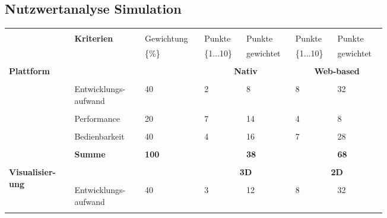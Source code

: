\documentclass[main.tex]{subfiles} %
\begin{document}

\subsection{Nutzwertanalyse Simulation}

\begin{table}[ht]
    \centering
    \begin{tabular}{|p{0.14\linewidth}|p{0.15\linewidth}|p{0.115\linewidth}|p{0.08\linewidth}|p{0.09\linewidth}|p{0.08\linewidth}|p{0.09\linewidth}|}
    \hline
        &&&&&&\\[-9pt]
        & \multirow{2}{*}{\textbf{Kriterien}} & Gewichtung & Punkte & Punkte & Punkte & Punkte \\[1pt]
        &  & \{\%\} & \{1...10\} & gewichtet & \{1...10\} & gewichtet \\[1pt]
        \hline
        \hline
        & \multicolumn{2}{c|}{} & \multicolumn{2}{c|}{} & \multicolumn{2}{c|}{} \\[-9pt]
        \multirow{5}{4em}{\textbf{Plattform}} & \multicolumn{2}{c|}{} & \multicolumn{2}{c|}{\textbf{Nativ}} & \multicolumn{2}{c|}{\textbf{Web-based}} \\[1pt]
        \cline{2-7}
        &&&&&&\\[-9pt]
        & Entwicklungs-aufwand & 40 & 2 & 8 & 8 & 32 \\[1pt]
        \cline{2-7}
        &&&&&&\\[-9pt]
        & Performance & 20 & 7 & 14 & 4 & 8 \\[1pt]
        \cline{2-7}
        &&&&&&\\[-9pt]
        & Bedienbarkeit & 40 & 4 & 16 & 7 & 28 \\[1pt]
        \cline{2-7}
        &&&&&&\\[-9pt]
        & \textbf{Summe} & \textbf{100} &  & \textbf{38} &  & \textbf{68} \\[1pt]
        \hline
        \hline
        & \multicolumn{2}{c|}{} & \multicolumn{2}{c|}{} & \multicolumn{2}{c|}{} \\[-9pt]
        \multirow{6}{4em}{\textbf{Visualisier-ung}} & \multicolumn{2}{c|}{} & \multicolumn{2}{c|}{\textbf{3D}} & \multicolumn{2}{c|}{\textbf{2D}} \\[1pt]
        \cline{2-7}
        &&&&&&\\[-9pt]
        & Entwicklungs-aufwand & 40 & 3 & 12 & 8 & 32 \\[1pt]
        \cline{2-7}
        &&&&&&\\[-9pt]

\end{tabular}
\end{table}
\end{document}
